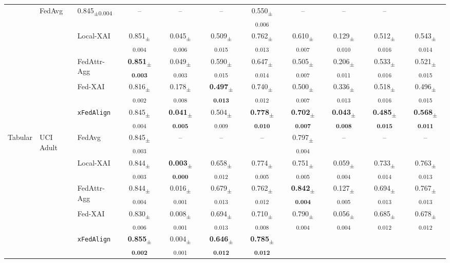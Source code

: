 \documentclass{article}
\newcommand{\meanstd}[2]{#1\textsubscript{\scriptsize$\pm$#2}}
\theoremstyle{plain}
\theoremstyle{definition}
\theoremstyle{remark}
\begin{document}
\begin{table}[t]
{\begin{tabular}{lllcccccccc}
    & FedAvg      
      & \meanstd{0.845}{0.004} & -- & -- & -- 
      & \meanstd{0.550}{0.006} & -- & -- & -- \\
  &  & Local-XAI      
      & \meanstd{0.851}{0.004} & \meanstd{0.045}{0.006} & \meanstd{0.509}{0.015} & \meanstd{0.762}{0.013}
      & \meanstd{0.610}{0.007} & \meanstd{0.129}{0.010} & \meanstd{0.512}{0.016} & \meanstd{0.543}{0.014} \\
  &  & FedAttr-Agg      
      & \textbf{\meanstd{0.851}{0.003}} & \meanstd{0.049}{0.003} & \meanstd{0.590}{0.015} & \meanstd{0.647}{0.014}
      & \meanstd{0.505}{0.007} & \meanstd{0.206}{0.011} & \meanstd{0.533}{0.016} & \meanstd{0.521}{0.015} \\
  &  & Fed-XAI      
      & \meanstd{0.816}{0.002} & \meanstd{0.178}{0.008} & \textbf{\meanstd{0.497}{0.013}} & \meanstd{0.740}{0.012}
      & \meanstd{0.500}{0.007} & \meanstd{0.336}{0.013} & \meanstd{0.518}{0.016} & \meanstd{0.496}{0.015} \\
  &  & \texttt{xFedAlign}      
      & \meanstd{0.845}{0.004} & \textbf{\meanstd{0.041}{0.005}} & \meanstd{0.504}{0.009} & \textbf{\meanstd{0.778}{0.010}}
      & \textbf{\meanstd{0.702}{0.007}} & \textbf{\meanstd{0.043}{0.008}} & \textbf{\meanstd{0.485}{0.015}} & \textbf{\meanstd{0.568}{0.011}} \\
\midrule
\multirow{10}{*}{\centering Tabular} 
  & \multirow{5}{*}{\centering UCI Adult} 
    & FedAvg      
      & \meanstd{0.845}{0.003} & -- & -- & -- 
      & \meanstd{0.797}{0.004} & -- & -- & -- \\
  &  & Local-XAI      
      & \meanstd{0.844}{0.003} & \textbf{\meanstd{0.003}{0.000}} & \meanstd{0.658}{0.012} & \meanstd{0.774}{0.005}
      & \meanstd{0.751}{0.005} & \meanstd{0.059}{0.004} & \meanstd{0.733}{0.014} & \meanstd{0.763}{0.013} \\
  &  & FedAttr-Agg      
      & \meanstd{0.844}{0.004} & \meanstd{0.016}{0.001} & \meanstd{0.679}{0.013} & \meanstd{0.762}{0.012}
      & \textbf{\meanstd{0.842}{0.004}} & \meanstd{0.127}{0.005} & \meanstd{0.694}{0.013} & \meanstd{0.767}{0.013} \\
  &  & Fed-XAI      
      & \meanstd{0.830}{0.006} & \meanstd{0.008}{0.001} & \meanstd{0.694}{0.013} & \meanstd{0.710}{0.008}
      & \meanstd{0.790}{0.004} & \meanstd{0.056}{0.004} & \meanstd{0.685}{0.012} & \meanstd{0.678}{0.012} \\
  &  & \texttt{xFedAlign}      
      & \textbf{\meanstd{0.855}{0.002}} & \meanstd{0.004}{0.001} & \textbf{\meanstd{0.646}{0.012}} & \textbf{\meanstd{0.785}{0.012}}

\end{tabular}}
\end{table}
\end{document}
